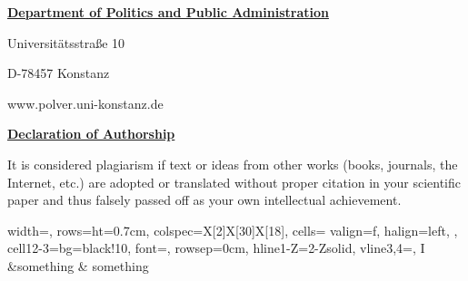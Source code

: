 {\small


\thispagestyle{page1}




\setlength{\parindent}{0cm}
\myhelvetica

{
    \raggedleft
    \small

    \textbf{\normalsize\ul{Department of Politics and Public Administration}}

    \scriptsize
    \vspace{0.4cm}

    Universitätsstraße 10

    D-78457 Konstanz

    \vspace{0.2cm}

    www.polver.uni-konstanz.de

}

\vspace{0.25cm}
\begingroup
{\large{\textbf{\ul{Declaration of Authorship}}}}

\raggedright
\vspace{0.25cm}

\begin{justify}
    It is considered plagiarism if text or ideas from other works (books, journals, the Internet, etc.) are adopted or translated without proper citation in your scientific paper and thus falsely passed off as your own intellectual achievement.
\end{justify}


\vspace{0.5cm}

\begin{tblr}{
    width=\linewidth,
    rows={ht=0.7cm},
    colspec={X[2]X[30]X[18]},
    cells= {
            valign=f,
            halign=left, 
            },
    cell{1}{2-3}={bg=black!10, font=\scriptsize},
    rowsep=0cm,
    hline{1-Z}={2-Z}{solid},
    vline{3,4}={},
}
    I &something & something\\
\end{tblr}

}
